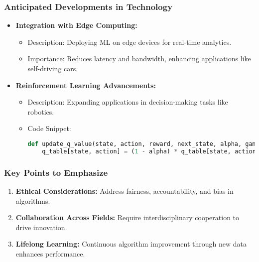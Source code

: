 \documentclass[aspectratio=169]{beamer}
\begin{document}
\begin{frame}[fragile]
    \frametitle{Anticipated Developments in Technology}
    \begin{itemize}
        \item \textbf{Integration with Edge Computing:}
        \begin{itemize}
            \item Description: Deploying ML on edge devices for real-time analytics.
            \item Importance: Reduces latency and bandwidth, enhancing applications like self-driving cars.
        \end{itemize}
        
        \item \textbf{Reinforcement Learning Advancements:}
        \begin{itemize}
            \item Description: Expanding applications in decision-making tasks like robotics.
            \item Code Snippet:
            \begin{lstlisting}[language=Python]
def update_q_value(state, action, reward, next_state, alpha, gamma):
    q_table[state, action] = (1 - alpha) * q_table[state, action] + alpha * (reward + gamma * max(q_table[next_state]))
            \end{lstlisting}
        \end{itemize}
    \end{itemize}
\end{frame}

\begin{frame}[fragile]
    \frametitle{Key Points to Emphasize}
    \begin{enumerate}
        \item \textbf{Ethical Considerations:} 
        Address fairness, accountability, and bias in algorithms.
        
        \item \textbf{Collaboration Across Fields:} 
        Require interdisciplinary cooperation to drive innovation.
        
        \item \textbf{Lifelong Learning:} 
        Continuous algorithm improvement through new data enhances performance.
    \end{enumerate}
\end{frame}
\end{document}
